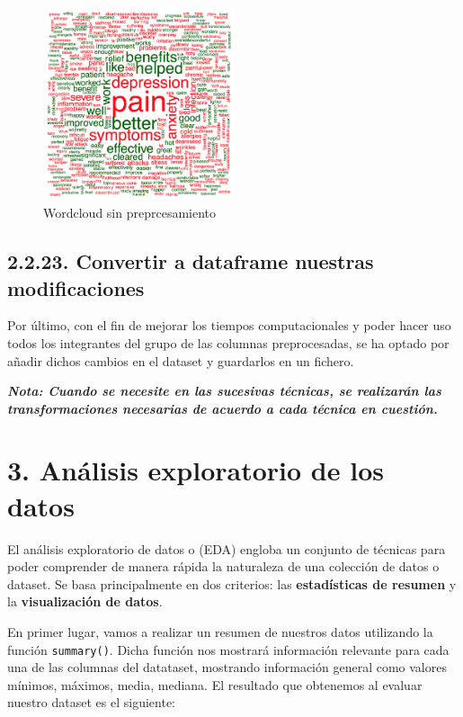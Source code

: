 \documentclass[spanish,]{article}
\begin{document}
\begin{figure}[h]
    \centering
    \includegraphics[width=0.5\textwidth]{imagenes/wordcloud2.png}
    \caption{Wordcloud sin preprcesamiento}
    \label{benefits2}
\end{figure}

\subsection{2.2.23. Convertir a dataframe nuestras
modificaciones}\label{convertir-a-dataframe-nuestras-modificaciones}

Por último, con el fin de mejorar los tiempos computacionales y poder
hacer uso todos los integrantes del grupo de las columnas preprocesadas,
se ha optado por añadir dichos cambios en el dataset y guardarlos en un
fichero.

\textbf{\emph{Nota: Cuando se necesite en las sucesivas técnicas, se
realizarán las transformaciones necesarias de acuerdo a cada técnica en
cuestión.}}

\newpage

\section{3. Análisis exploratorio de los
datos}\label{analisis-exploratorio-de-los-datos}

El análisis exploratorio de datos o (EDA) engloba un conjunto de
técnicas para poder comprender de manera rápida la naturaleza de una
colección de datos o dataset. Se basa principalmente en dos criterios:
las \textbf{estadísticas de resumen} y la \textbf{visualización de
datos}.

En primer lugar, vamos a realizar un resumen de nuestros datos
utilizando la función \texttt{summary()}. Dicha función nos mostrará
información relevante para cada una de las columnas del datataset,
mostrando información general como valores mínimos, máximos, media,
mediana. El resultado que obtenemos al evaluar nuestro dataset es el
siguiente:
\end{document}
